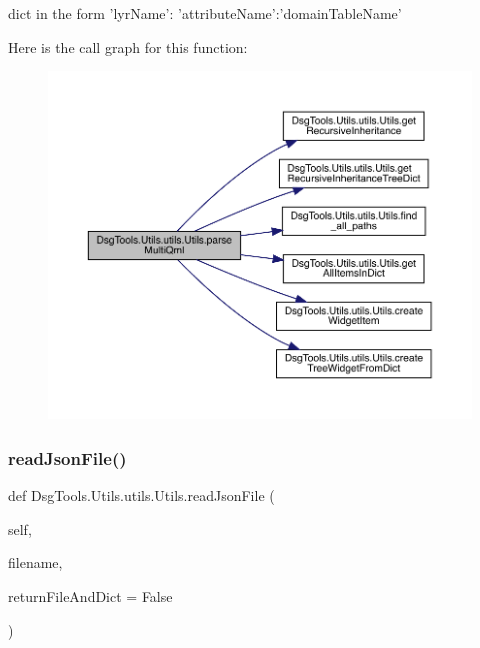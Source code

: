 \begin{DoxyVerb}dict in the form {'lyrName': {'attributeName':'domainTableName'}}
\end{DoxyVerb}
 Here is the call graph for this function\+:
\nopagebreak
\begin{figure}[H]
\begin{center}
\leavevmode
\includegraphics[width=350pt]{class_dsg_tools_1_1_utils_1_1utils_1_1_utils_a340feb10d8eb550fbc1ebd5d62f2e022_cgraph}
\end{center}
\end{figure}
\mbox{\label{class_dsg_tools_1_1_utils_1_1utils_1_1_utils_a6e911bdef39886b4f1056d746388294c}} 
\subsubsection{\texorpdfstring{read\+Json\+File()}{readJsonFile()}}
{\footnotesize\ttfamily def Dsg\+Tools.\+Utils.\+utils.\+Utils.\+read\+Json\+File (\begin{DoxyParamCaption}\item[{}]{self,  }\item[{}]{filename,  }\item[{}]{return\+File\+And\+Dict = {\ttfamily False} }\end{DoxyParamCaption})}

